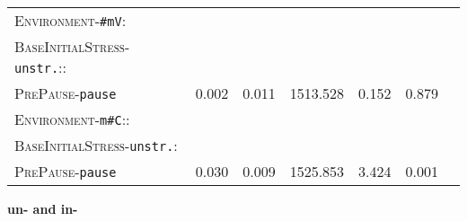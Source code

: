 \begin{table}
{\begin{tabular} {lrrrrrr}
		\textsc{Environment}-\texttt{\#mV}:&&&&&\\
		\textsc{BaseInitialStress}-\texttt{unstr.}::&&&&&\\
		\textsc{PrePause}-\texttt{pause} & \color[HTML]{9B9B9B}0.002 & \color[HTML]{9B9B9B}0.011 & \color[HTML]{9B9B9B}1513.528 & \color[HTML]{9B9B9B}0.152 &\color[HTML]{9B9B9B}0.879 \\ 
		\textsc{Environment}-\texttt{m\#C}::&&&&&\\
		\textsc{BaseInitialStress}-\texttt{unstr.}:&&&&&\\
		\textsc{PrePause}-\texttt{pause }& 0.030 & 0.009 & 1525.853 & 3.424 & 0.001 \\ 
		\midrule		
		
			\end{tabular}
}


\end{table}
\clearpage

\textbf{un- and in-}


